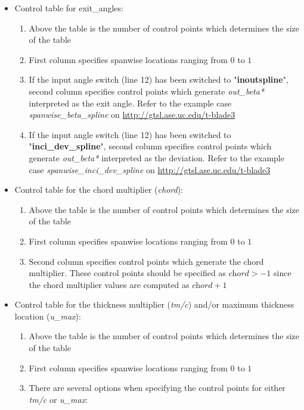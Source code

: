 \documentclass[8pt]{article}
\begin{document}
\begin{itemize}[leftmargin=*]
\begin{enumerate}[label=\alph*]
    \end{enumerate}
    \item Control table for exit\_angles:
    \begin{enumerate}[label=\alph*]
        \item Above the table is the number of control points which determines the size of the table
        \item First column specifies spanwise locations ranging from $0$ to $1$
        \item If the input angle switch (line 12) has been switched to "\textbf{inoutspline}", second column specifies control points which generate \textit{out\_beta*} interpreted as the exit angle. Refer to the example case \textit{spanwise\_beta\_spline} on \url{http://gtsl.ase.uc.edu/t-blade3}
        \item If the input angle switch (line 12) has been switched to "\textbf{inci\_dev\_spline}", second column specifies control points which generate \textit{out\_beta*} interpreted as the deviation. Refer to the example case \textit{spanwise\_inci\_dev\_spline} on \url{http://gtsl.ase.uc.edu/t-blade3}
    \end{enumerate}
    \item Control table for the chord multiplier (\textit{chord}):
    \begin{enumerate}[label=\alph*]
        \item Above the table is the number of control points which determines the size of the table
        \item First column specifies spanwise locations ranging from $0$ to $1$
        \item Second column specifies control points which generate the chord multiplier. These control points should be specified as $\textit{chord} > -1$ since the chord multiplier values are computed as $\textit{chord} + 1$ 
    \end{enumerate}
    \item Control table for the thickness multiplier (\textit{tm/c}) and/or maximum thickness location (\textit{u\_max}):
    \begin{enumerate}[label=\alph*]
        \item Above the table is the number of control points which determines the size of the table
        \item First column specifies spanwise locations ranging from $0$ to $1$
        \item There are several options when specifying the control points for either \textit{tm/c} or \textit{u\_max}:

\end{enumerate}
\end{itemize}
\end{document}
